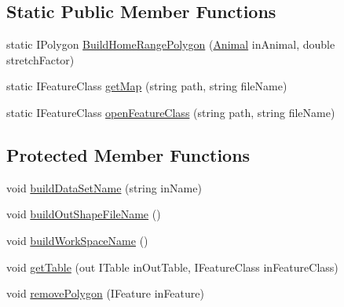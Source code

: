 \subsection*{Static Public Member Functions}
\begin{DoxyCompactItemize}
\item 
static I\-Polygon \hyperlink{class_s_e_a_r_c_h_1_1_map_a6a3f3153fc9c97c281a84a88b097291f}{Build\-Home\-Range\-Polygon} (\hyperlink{class_s_e_a_r_c_h_1_1_animal}{Animal} in\-Animal, double stretch\-Factor)
\item 
static I\-Feature\-Class \hyperlink{class_s_e_a_r_c_h_1_1_map_a896a793f7f87aec6339e894e69457e7a}{get\-Map} (string path, string file\-Name)
\item 
static I\-Feature\-Class \hyperlink{class_s_e_a_r_c_h_1_1_map_ada8c27f808eda6bf8db7bf92459b724a}{open\-Feature\-Class} (string path, string file\-Name)
\end{DoxyCompactItemize}
\subsection*{Protected Member Functions}
\begin{DoxyCompactItemize}
\item 
void \hyperlink{class_s_e_a_r_c_h_1_1_map_af4a367d729f5ab652f220804539c1f2c}{build\-Data\-Set\-Name} (string in\-Name)
\item 
void \hyperlink{class_s_e_a_r_c_h_1_1_map_af79f2e8da9452a0d3407327dcb524e93}{build\-Out\-Shape\-File\-Name} ()
\item 
void \hyperlink{class_s_e_a_r_c_h_1_1_map_a9c6b5e23b7fd722b080b437e12a5d55d}{build\-Work\-Space\-Name} ()
\item 
void \hyperlink{class_s_e_a_r_c_h_1_1_map_ad43939d23b677a9f309784a0383f7c68}{get\-Table} (out I\-Table in\-Out\-Table, I\-Feature\-Class in\-Feature\-Class)
\item 
void \hyperlink{class_s_e_a_r_c_h_1_1_map_af8526bf1407a619bd6e54347c65234e9}{remove\-Polygon} (I\-Feature in\-Feature)
\end{DoxyCompactItemize}

